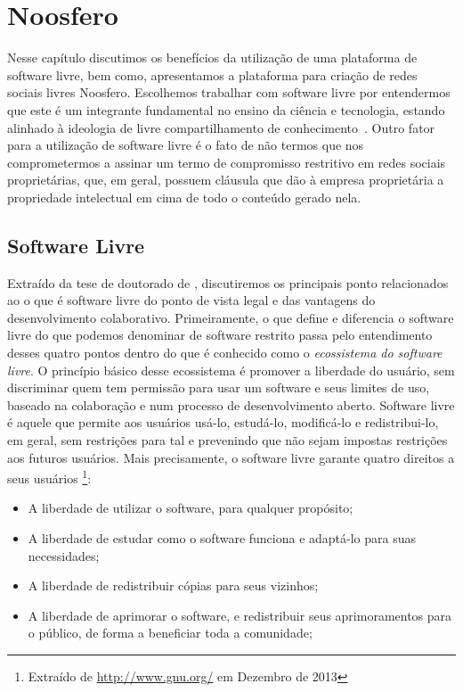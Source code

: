 \chapter{Noosfero}
\label{cap:noosfero}

Nesse capítulo discutimos os benefícios da utilização de uma
plataforma de software livre, bem como, apresentamos a plataforma para criação de
redes sociais livres Noosfero.
%
Escolhemos trabalhar com software livre por
entendermos que este é um integrante fundamental no ensino da ciência e 
tecnologia, estando alinhado à ideologia de livre compartilhamento de
conhecimento~\cite{kon2011}.
%
Outro fator para a utilização de software livre é o
fato de não termos que nos comprometermos a assinar um termo de compromisso
restritivo em redes sociais proprietárias, que, em geral, possuem cláusula que dão à
empresa proprietária a propriedade intelectual em cima de todo o conteúdo
gerado nela.


\section{Software Livre}

Extraído da tese de doutorado de , discutiremos os
principais ponto relacionados ao o que é software livre do ponto de vista legal e
das vantagens do desenvolvimento colaborativo.
%
Primeiramente, o que define e diferencia
o software livre do que podemos denominar de software restrito passa pelo
entendimento desses quatro pontos dentro do que é
conhecido como o \textit{ecossistema do software livre}.
%
O princípio básico desse ecossistema é promover a liberdade do usuário,
sem discriminar quem tem permissão para usar um software e seus limites de uso,
baseado na colaboração e num processo de desenvolvimento aberto.
%
Software livre é aquele que permite aos usuários usá-lo, estudá-lo, modificá-lo e
redistribui-lo, em geral, sem restrições para tal e prevenindo que não sejam
impostas restrições aos futuros usuários. 
%
Mais precisamente, o software livre garante quatro direitos a seus usuários%
\footnote{Extraído de \url{http://www.gnu.org/} em Dezembro de 2013}:

\begin{itemize}
  \item A liberdade de utilizar o software, para qualquer propósito;
  \item A liberdade de estudar como o software funciona e adaptá-lo para suas necessidades;
  \item A liberdade de redistribuir cópias para seus vizinhos;
  \item A liberdade de aprimorar o software, e redistribuir seus aprimoramentos para o público,
  de forma a beneficiar toda a comunidade;
\end{itemize}

